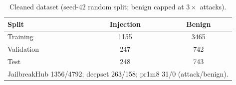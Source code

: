 \begin{table}[t]
\centering
\caption{Cleaned dataset (seed-42 random split; benign capped at $3\times$ attacks).}
\label{tab:dataset}
\small
\begin{tabular}{lcc}
\toprule
\textbf{Split} & \textbf{Injection} & \textbf{Benign} \\
\midrule
Training & 1155 & 3465 \\
Validation & 247 & 742 \\
Test & 248 & 743 \\
\midrule
\multicolumn{3}{l}{\footnotesize JailbreakHub 1356/4792; deepset 263/158; pr1m8 31/0 (attack/benign).}\\
\bottomrule
\end{tabular}
\end{table}
